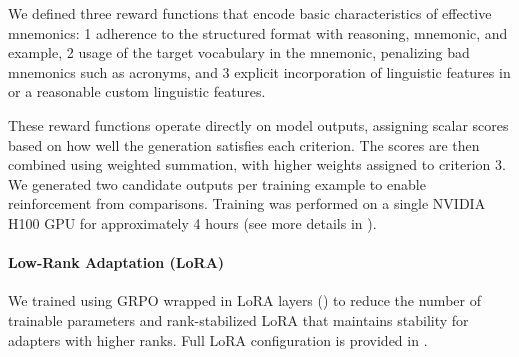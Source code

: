 We defined three reward functions that encode basic characteristics of effective mnemonics:
\numlist{1} adherence to the structured format with reasoning, mnemonic, and example,
\numlist{2} usage of the target vocabulary in the mnemonic, penalizing bad mnemonics such as acronyms, and
\numlist{3} explicit incorporation of linguistic features in  or a reasonable custom linguistic features.

These reward functions operate directly on model outputs, assigning scalar scores based on how well the generation satisfies each criterion. The scores are then combined using weighted summation, with higher weights assigned to criterion 3. We generated two candidate outputs per training example to enable reinforcement from comparisons. Training was performed on a single NVIDIA H100 GPU for approximately 4 hours (see more details in ).

\paragraph*{Low-Rank Adaptation (LoRA)} We trained \studentmodel using GRPO wrapped in LoRA layers () to reduce the number of trainable parameters and rank-stabilized LoRA that maintains stability for adapters with higher ranks. Full LoRA configuration is provided in .
